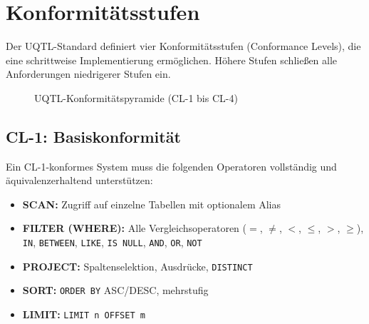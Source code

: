 ﻿%
\section{Konformitätsstufen}
\label{sec:konformitaet}

Der UQTL-Standard definiert vier Konformitätsstufen (Conformance Levels),
die eine schrittweise Implementierung ermöglichen. Höhere Stufen schließen
alle Anforderungen niedrigerer Stufen ein.

\begin{figure}[H]
\centering
{}
\caption{UQTL-Konformitätspyramide (CL-1 bis CL-4)}
\label{fig:konformitaet}
\end{figure}

\subsection{CL-1: Basiskonformität}
\label{subsec:cl1}

Ein CL-1-konformes System muss die folgenden Operatoren vollständig und
äquivalenzerhaltend unterstützen:

\begin{itemize}[leftmargin=1.5cm]
  \item \textbf{SCAN:} Zugriff auf einzelne Tabellen mit optionalem Alias
  \item \textbf{FILTER (WHERE):} Alle Vergleichsoperatoren ($=$, $\neq$, $<$, $\leq$, $>$, $\geq$),
    \texttt{IN}, \texttt{BETWEEN}, \texttt{LIKE}, \texttt{IS NULL}, \texttt{AND}, \texttt{OR}, \texttt{NOT}
  \item \textbf{PROJECT:} Spaltenselektion, Ausdrücke, \texttt{DISTINCT}
  \item \textbf{SORT:} \texttt{ORDER BY} ASC/DESC, mehrstufig
  \item \textbf{LIMIT:} \texttt{LIMIT n OFFSET m}
\end{itemize}

